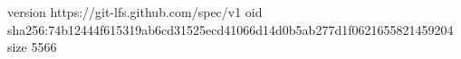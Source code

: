 version https://git-lfs.github.com/spec/v1
oid sha256:74b12444f615319ab6cd31525ecd41066d14d0b5ab277d1f0621655821459204
size 5566
